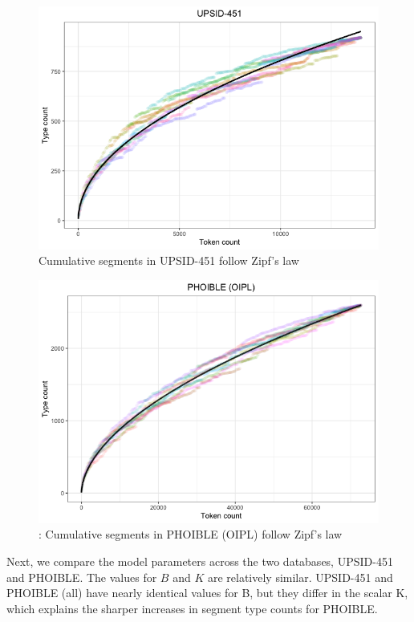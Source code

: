 \documentclass[
]{article}
\begin{document}
\begin{figure}

{\centering \includegraphics[width=0.8\linewidth]{README_files/figure-gfm/heaps_upsid-1} 

}

\caption{\label{fig:upsid}Cumulative segments in UPSID-451 follow Zipf's law}\label{fig:upsid_heaps}
\end{figure}

\begin{figure}

{\centering \includegraphics[width=0.8\linewidth]{README_files/figure-gfm/heaps_phoible_oipl-1} 

}

\caption{\label{fig:upsid}: Cumulative segments in PHOIBLE (OIPL) follow Zipf's law}\label{fig:phoible_heaps}
\end{figure}

Next, we compare the model parameters across the two databases,
UPSID-451 and PHOIBLE. The values for \(B\) and \(K\) are relatively
similar. UPSID-451 and PHOIBLE (all) have nearly identical values for B,
but they differ in the scalar K, which explains the sharper increases in
segment type counts for PHOIBLE.
\end{document}
